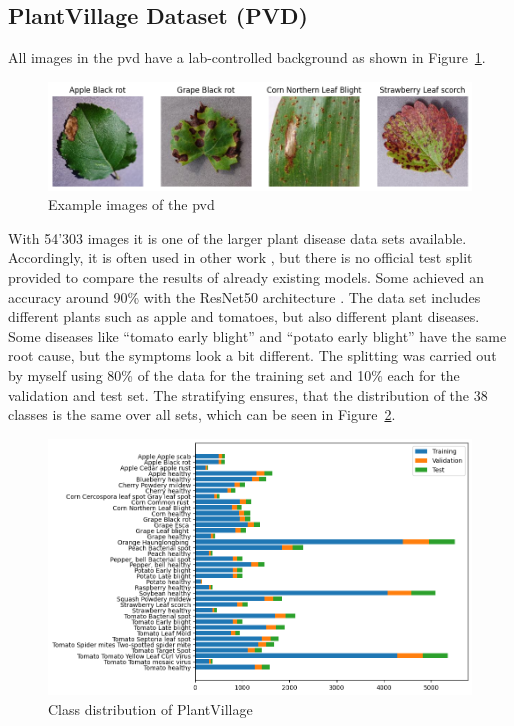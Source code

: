 \subsection{PlantVillage Dataset (PVD)}
All images in the \gls{pvd} have a lab-controlled background as shown in Figure~\ref{fig:example_images_of_plantvillage}. 
\begin{figure}[H]
    \begin{center}
    \includegraphics[width=15cm]{../../images/example_images_of_plantvillage.png}
    \caption{Example images of the \gls{pvd}}\label{fig:example_images_of_plantvillage}
    \end{center}
\end{figure}
With 54'303 images it is one of the larger plant disease data sets available. Accordingly, it is often used in other work \autocite{hughes2016}, but there is no official test split provided to compare the results of already existing models. Some achieved an accuracy around 90\% with the ResNet50 architecture \autocite{gole2023}.
The data set includes different plants such as apple and tomatoes, but also different plant diseases. Some diseases like ``tomato early blight'' and ``potato early blight'' have the same root cause, but the symptoms look a bit different. 
The splitting was carried out by myself using 80\% of the data for the training set and 10\% each for the validation and test set. The stratifying ensures, that the distribution of the 38 classes is the same over all sets, which can be seen in Figure~\ref{fig:class_distribution_of_plantvillage}.
\begin{figure}[H]
    \begin{center}
    \includegraphics[width=15cm]{../../images/class_distribution_of_plantvillage.png}
    \caption{Class distribution of PlantVillage}\label{fig:class_distribution_of_plantvillage}
    \end{center}
\end{figure}

